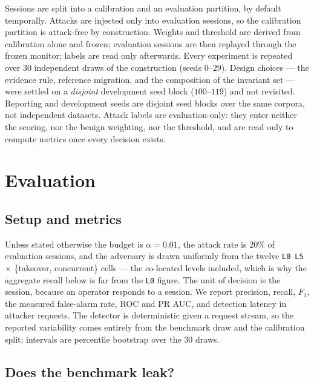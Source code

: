 \documentclass[conference]{IEEEtran}
\begin{document}
Sessions are split into a calibration and an evaluation partition, by default
temporally.  Attacks are injected only into evaluation sessions, so the
calibration partition is attack-free by construction.  Weights and threshold are
derived from calibration alone and frozen; evaluation sessions are then replayed
through the frozen monitor; labels are read only afterwards.  Every experiment
is repeated over $30$ independent draws of the construction (seeds
$0$--$29$).  Design choices --- the evidence rule, reference migration, and the
composition of the invariant set --- were settled on a \emph{disjoint}
development seed block ($100$--$119$) and not revisited.  Reporting and
development seeds are disjoint seed blocks over the same corpora, not independent
datasets.  Attack labels are evaluation-only: they enter neither the scoring, nor
the benign weighting, nor the threshold, and are read only to compute metrics
once every decision exists.

\section{Evaluation}
\label{sec:eval}

\subsection{Setup and metrics}

Unless stated otherwise the budget is $\alpha=0.01$, the attack rate is $20\%$
of evaluation sessions, and the adversary is drawn uniformly from the twelve
\texttt{L0}--\texttt{L5} $\times$ \{takeover, concurrent\} cells --- the
co-located levels included, which is why the aggregate recall below is far from
the \texttt{L0} figure.  The unit of
decision is the session, because an operator responds to a session.  We report
precision, recall, $F_1$, the measured false-alarm rate, ROC and PR AUC, and
detection latency in attacker requests.  The detector is deterministic given a
request stream, so the reported variability comes entirely from the benchmark
draw and the calibration split; intervals are percentile bootstrap over the
$30$ draws.

\subsection{Does the benchmark leak?}
\label{sec:leakage}
\end{document}
